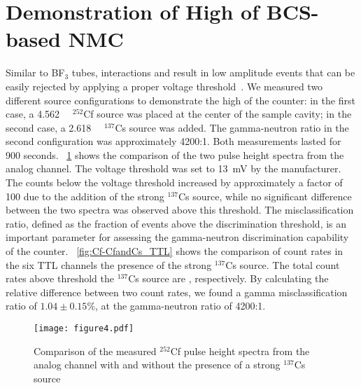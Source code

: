 \documentclass[preprint,final]{elsarticle}
\begin{document}
\section{Demonstration of High  of BCS-based NMC}\label{sec:gamma_insensitivity}
Similar to BF${}_3$ tubes,  interactions and  result in low amplitude events that can be easily rejected by applying a proper voltage threshold~\cite{knoll2010radiation}. We measured two different source configurations to demonstrate the high  of the counter: in the first case, a {\SI{4.562}{\micro\Ci}} ${}^{252}$Cf source was placed at the center of the sample cavity; in the second case, a {\SI{2.618}{\milli\Ci}} ${}^{137}$Cs source was added. The gamma-neutron ratio in the second configuration was approximately {4200}:1. Both measurements lasted for 900 seconds. ~\ref{fig:Cf-CfandCs} shows the comparison of the two pulse height spectra from the analog channel. The voltage threshold was set to \SI{13}{\milli\volt} by the manufacturer. The counts below the voltage threshold increased by approximately a factor of 100 due to the addition of the strong ${}^{137}$Cs source, while no significant difference between the two spectra was observed above this threshold.
The  misclassification ratio, defined as the fraction of  events above the discrimination threshold, is an important parameter for assessing the gamma-neutron discrimination capability of the counter. ~\ref{fig:Cf-CfandCs_TTL} shows the comparison of count rates in the six TTL channels  the presence of the strong ${}^{137}$Cs source. The total count rates above threshold  the ${}^{137}$Cs source are , respectively. By calculating the relative difference between two count rates, we found a gamma misclassification ratio of $1.04\pm0.15$\%, at the gamma-neutron ratio of {4200}:1.
\begin{figure}[!htbp]
    \centering
     \texttt{[image: figure4.pdf]}
    \caption{Comparison of the measured ${}^{252}$Cf pulse height spectra from the analog channel with and without the presence of a strong ${}^{137}$Cs source}
    \label{fig:Cf-CfandCs}
\end{figure}
\end{document}
